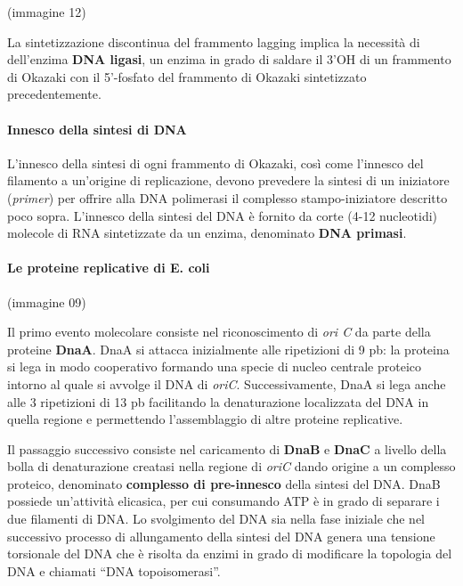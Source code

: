 \documentclass[]{article}
\begin{document}
(immagine 12)

La sintetizzazione discontinua del frammento lagging implica la
necessità di dell'enzima \textbf{DNA ligasi}, un enzima in grado di
saldare il 3'OH di un frammento di Okazaki con il 5'-fosfato del
frammento di Okazaki sintetizzato precedentemente.

\paragraph{Innesco della sintesi di
DNA}\label{innesco-della-sintesi-di-dna}

L'innesco della sintesi di ogni frammento di Okazaki, così come
l'innesco del filamento a un'origine di replicazione, devono prevedere
la sintesi di un iniziatore (\emph{primer}) per offrire alla DNA
polimerasi il complesso stampo-iniziatore descritto poco sopra.
L'innesco della sintesi del DNA è fornito da corte (4-12 nucleotidi)
molecole di RNA sintetizzate da un enzima, denominato \textbf{DNA
primasi}.

\paragraph{Le proteine replicative di E.
coli}\label{le-proteine-replicative-di-e.-coli}

(immagine 09)

Il primo evento molecolare consiste nel riconoscimento di \emph{ori C}
da parte della proteine \textbf{DnaA}. DnaA si attacca inizialmente alle
ripetizioni di 9 pb: la proteina si lega in modo cooperativo formando
una specie di nucleo centrale proteico intorno al quale si avvolge il
DNA di \emph{oriC}. Successivamente, DnaA si lega anche alle 3
ripetizioni di 13 pb facilitando la denaturazione localizzata del DNA in
quella regione e permettendo l'assemblaggio di altre proteine
replicative.

Il passaggio successivo consiste nel caricamento di \textbf{DnaB} e
\textbf{DnaC} a livello della bolla di denaturazione creatasi nella
regione di \emph{oriC} dando origine a un complesso proteico, denominato
\textbf{complesso di pre-innesco} della sintesi del DNA. DnaB possiede
un'attività elicasica, per cui consumando ATP è in grado di separare i
due filamenti di DNA. Lo svolgimento del DNA sia nella fase iniziale che
nel successivo processo di allungamento della sintesi del DNA genera una
tensione torsionale del DNA che è risolta da enzimi in grado di
modificare la topologia del DNA e chiamati ``DNA topoisomerasi''.
\end{document}
